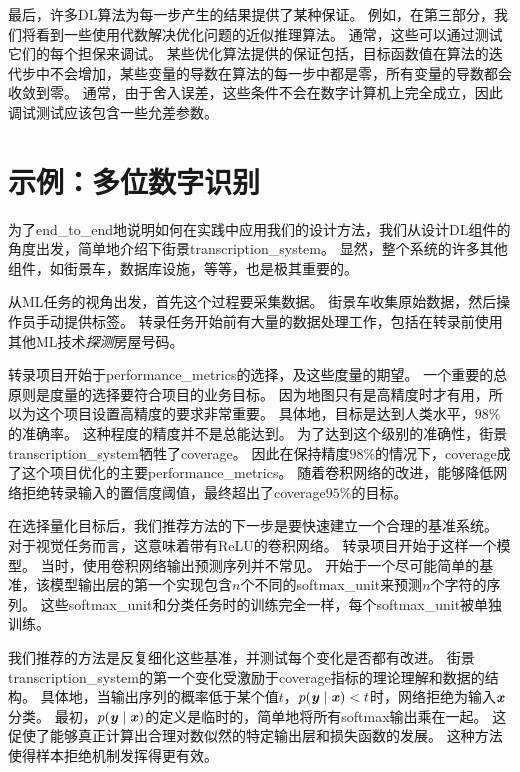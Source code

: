 
最后，许多\gls{DL}算法为每一步产生的结果提供了某种保证。
例如，在第三部分，我们将看到一些使用代数解决优化问题的近似推理算法。
通常，这些可以通过测试它们的每个担保来调试。
某些优化算法提供的保证包括，目标函数值在算法的迭代步中不会增加，某些变量的导数在算法的每一步中都是零，所有变量的导数都会收敛到零。
通常，由于舍入误差，这些条件不会在数字计算机上完全成立，因此调试测试应该包含一些允差参数。

\section{示例：多位数字识别}
\label{sec:example_multi_digit_number_recognition}
为了\gls{end_to_end}地说明如何在实践中应用我们的设计方法，我们从设计\gls{DL}组件的角度出发，简单地介绍下街景\gls{transcription_system}。
显然，整个系统的许多其他组件，如街景车，数据库设施，等等，也是极其重要的。

从\gls{ML}任务的视角出发，首先这个过程要采集数据。
街景车收集原始数据，然后操作员手动提供标签。
转录任务开始前有大量的数据处理工作，包括在转录前使用其他\gls{ML}技术\emph{探测}房屋号码。

转录项目开始于\gls{performance_metrics}的选择，及这些度量的期望。
一个重要的总原则是度量的选择要符合项目的业务目标。
因为地图只有是高精度时才有用，所以为这个项目设置高精度的要求非常重要。
具体地，目标是达到人类水平，$98\%$的准确率。
这种程度的精度并不是总能达到。
为了达到这个级别的准确性，街景\gls{transcription_system}牺牲了\gls{coverage}。
因此在保持精度$98\%$的情况下，\gls{coverage}成了这个项目优化的主要\gls{performance_metrics}。
随着卷积网络的改进，能够降低网络拒绝转录输入的置信度阈值，最终超出了\gls{coverage}$95\%$的目标。


在选择量化目标后，我们推荐方法的下一步是要快速建立一个合理的基准系统。
对于视觉任务而言，这意味着带有\gls{ReLU}的卷积网络。
转录项目开始于这样一个模型。
当时，使用卷积网络输出预测序列并不常见。
开始于一个尽可能简单的基准，该模型输出层的第一个实现包含$n$个不同的\gls{softmax_unit}来预测$n$个字符的序列。
这些\gls{softmax_unit}和分类任务时的训练完全一样，每个\gls{softmax_unit}被单独训练。


我们推荐的方法是反复细化这些基准，并测试每个变化是否都有改进。
街景\gls{transcription_system}的第一个变化受激励于\gls{coverage}指标的理论理解和数据的结构。
具体地，当输出序列的概率低于某个值$t$，$p(\boldsymbol{\mathit{y}}\mid\boldsymbol{\mathit{x}}) < t$时，网络拒绝为输入$\boldsymbol{\mathit{x}}$分类。
最初，$p(\boldsymbol{\mathit{y}}\mid\boldsymbol{\mathit{x}})$的定义是临时的，简单地将所有\gls{softmax}输出乘在一起。
这促使了能够真正计算出合理对数似然的特定输出层和损失函数的发展。
这种方法使得样本拒绝机制发挥得更有效。


